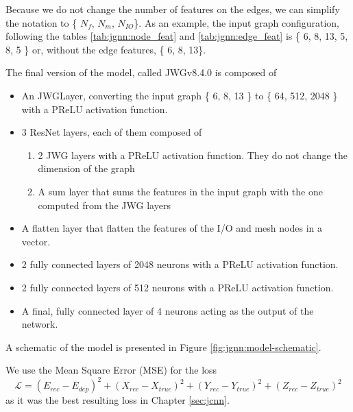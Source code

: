 \documentclass[../main.tex]{subfiles}
\begin{document}
Because we do not change the number of features on the edges, we can simplify the notation to \{{\color{red} $N_{f}$}, {\color{Dandelion} $N_{m}$}, {\color{blue} $N_{IO}$}\}. As an example, the input graph configuration, following the tables \ref{tab:jgnn:node_feat} and \ref{tab:jgnn:edge_feat} is \{{\color{red} 6}, {\color{Dandelion} 8}, {\color{blue} 13}, 5, 8, 5 \} or, without the edge features, \{{\color{red} 6}, {\color{Dandelion} 8}, {\color{blue} 13}\}.

The final version of the model, called JWGv8.4.0 is composed of
\begin{itemize}
  \item An JWGLayer, converting the input graph \{{\color{red} 6}, {\color{Dandelion} 8}, {\color{blue} 13} \} to \{ 64, 512, 2048 \} with a PReLU activation function.
  \item 3 ResNet layers, each of them composed of
    \begin{enumerate}
      \item 2 JWG layers with a PReLU activation function. They do not change the dimension of the graph
      \item A sum layer that sums the features in the input graph with the one computed from the JWG layers
    \end{enumerate}
  \item A flatten layer that flatten the features of the I/O and mesh nodes in a vector.
  \item 2 fully connected layers of 2048 neurons with a PReLU activation function.
  \item 2 fully connected layers of 512 neurons with a PReLU activation function.
  \item A final, fully connected layer of 4 neurons acting as the output of the network.
\end{itemize}
A schematic of the model is presented in Figure \ref{fig:jgnn:model-schematic}.

We use the Mean Square Error (MSE) for the loss
\begin{equation}
  \mathcal{L} = (E_{rec} - E_{dep})^2 + (X_{rec} - X_{true})^2 + (Y_{rec} - Y_{true})^2 + (Z_{rec} - Z_{true})^2
\end{equation}
as it was the best resulting loss in Chapter \ref{sec:jcnn}.
\end{document}
